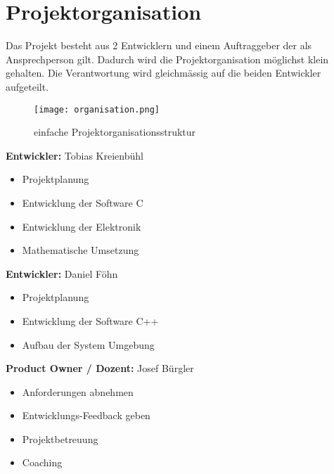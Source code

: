 \section{Projektorganisation}
    Das Projekt besteht aus 2 Entwicklern und einem Auftraggeber der als Ansprechperson gilt. Dadurch wird die Projektorganisation möglichst klein gehalten. Die Verantwortung wird gleichmässig auf die beiden Entwickler aufgeteilt.
    \begin{figure}[H]%
        \centering
        \texttt{[image: organisation.png]}
        \caption{einfache Projektorganisationsstruktur}
        \label{fig:projektorganisation}
    \end{figure}
	\noindent\textbf{Entwickler:} Tobias Kreienbühl
    \begin{itemize}
        \item Projektplanung
        \item Entwicklung der Software C
        \item Entwicklung der Elektronik
        \item Mathematische Umsetzung
    \end{itemize}
    \vspace{.5cm}
    \textbf{Entwickler:} Daniel Föhn
    \begin{itemize}
        \item Projektplanung
        \item Entwicklung der Software C++
        \item Aufbau der System Umgebung
    \end{itemize}
    \vspace{.5cm}
    \textbf{Product Owner / Dozent:} Josef Bürgler
    \begin{itemize}
        \item Anforderungen abnehmen
        \item Entwicklungs-Feedback geben
        \item Projektbetreuung
        \item Coaching
    \end{itemize}